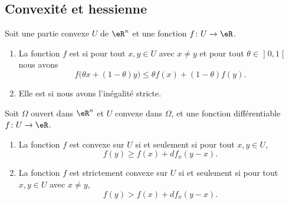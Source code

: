 \subsection{Convexité et hessienne}

\begin{definition}      \label{DEFooKCFPooLwKAsS}
	Soit une partie convexe \( U\) de \( \eR^n\) et une fonction \( f\colon U\to \eR\).
	\begin{enumerate}
		\item
		      La fonction \( f\) est  si pour tout \( x,y\in U\) avec \( x\neq y\) et pour tout \( \theta\in\mathopen] 0 , 1 \mathclose[\) nous avons
		      \begin{equation}
			      f\big( \theta x+(1-\theta)y \big)\leq \theta f(x)+(1-\theta)f(y).
		      \end{equation}
		\item
		      Elle est  si nous avons l'inégalité stricte.
	\end{enumerate}
\end{definition}

\begin{proposition}      \label{PROPooYNNHooSHLvHp}
	Soit \( \Omega\) ouvert dans \( \eR^n\) et \( U\) convexe dans \( \Omega\), et une fonction différentiable \( f\colon U\to \eR\).
	\begin{enumerate}
		\item       \label{ITEMooRVIVooIayuPS}
		      La fonction \( f\) est convexe sur \( U\) si et seulement si pour tout \( x,y\in U\),
		      \begin{equation}
			      f(y)\geq f(x)+df_x(y-x).
		      \end{equation}
		\item       \label{ITEMooCWEWooFtNnKl}
		      La fonction \( f\) est strictement convexe sur \( U\) si et seulement si pour tout \( x,y\in U\) avec \( x\neq y\),
		      \begin{equation}
			      f(y)>f(x)+df_x(y-x).
		      \end{equation}
	\end{enumerate}
\end{proposition}

